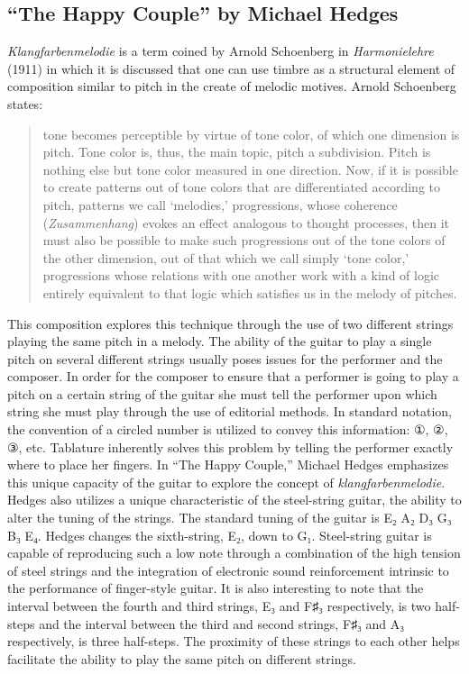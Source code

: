 \documentclass{tufte-handout}
\begin{document}
\subsection*{``The Happy Couple'' by Michael Hedges}
\emph{Klangfarbenmelodie} is a term coined by Arnold Schoenberg in \emph{Harmonielehre} (1911) in which it is discussed that one can use timbre as a structural element of composition similar to pitch in the create of melodic motives. Arnold Schoenberg states:
\begin{quote}
  tone becomes perceptible by virtue of tone color, of which one dimension is pitch. Tone color is, thus, the main topic, pitch a subdivision. Pitch is nothing else but tone color measured in one direction. Now, if it is possible to create patterns out of tone colors that are differentiated according to pitch, patterns we call `melodies,' progressions, whose coherence (\emph{Zusammenhang}) evokes an effect analogous to thought processes, then it must also be possible to make such progressions out of the tone colors of the other dimension, out of that which we call simply `tone color,' progressions whose relations with one another work with a kind of logic entirely equivalent to that logic which satisfies us in the melody of pitches.
\end{quote}
This composition explores this technique through the use of two different strings playing the same pitch in a melody. The ability of the guitar to play a single pitch on several different strings usually poses issues for the performer and the composer. In order for the composer to ensure that a performer is going to play a pitch on a certain string of the guitar she must tell the performer upon which string she must play through the use of editorial methods. In standard notation, the convention of a circled number is utilized to convey this information: ①, ②, ③, etc. Tablature inherently solves this problem by telling the performer exactly where to place her fingers. In ``The Happy Couple,'' Michael Hedges emphasizes this unique capacity of the guitar to explore the concept of \emph{klangfarbenmelodie}. Hedges also utilizes a unique characteristic of the steel-string guitar, the ability to alter the tuning of the strings. The standard tuning of the guitar is E₂ A₂ D₃ G₃ B₃ E₄. Hedges changes the sixth-string, E₂, down to G₁. Steel-string guitar is capable of reproducing such a low note through a combination of the high tension of steel strings and the integration of electronic sound reinforcement intrinsic to the performance of finger-style guitar. It is also interesting to note that the interval between the fourth and third strings, E₃ and F♯₃ respectively, is two half-steps and the interval between the third and second strings, F♯₃ and A₃ respectively, is three half-steps. The proximity of these strings to each other helps facilitate the ability to play the same pitch on different strings.
\end{document}
